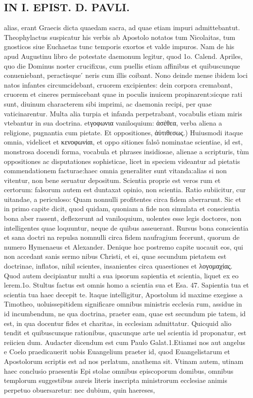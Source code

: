 \documentclass{article}
\begin{document}
\begin{pages}
\section*{IN I. EPIST. D. PAVLI. }
\marginpar{[ p.134 ]}\pstart alias, erant Graecis dicta quaedam sacra, ad quae etiam impuri admittebantut. Theophylactus suspicatur his verbis ab Apostolo notatos tum Nicolaitas, tum gnosticos siue Euchaetas tunc temporis exortos et valde impuros. Nam de his apud Augustinu libro de potestate daemonum legitur, quod 1o. Calend. Apriles, quo die Dominus noster crucifixus, cum puellis etiam affinibus et quibuscunque conueniebant, peractisque ́ neris cum illis coibant. Nono deinde mense ibidem loci natos infantes circumcidebant, cruorem excipientes: dein corpora cremabant, cruorem et cineres permiscebant quae in poculis inuicem propinarent:sicque rati sunt, diuinum characterem sibi imprimi, ac daemonia recipi, per quae vaticinarentur. Multa alia turpia et infanda perpetrabant, vocabulis etiam miris vtebantur in sua doctrina. etγοφωνια vaniloquium: ἀσέθεα, verba aliena a religione, pugnantia cum pietate.  \pend\pstart Et oppositiones, ἀὐτιθεσως.) Huiusmodi itaque omnia, videlicet et κενοφωνίαι, et oppo sitiones falsô nominatae scientiae, id est, monstrosa docendi forma, vocabula et phrases insidiosae, alienae a scripturis, tùm oppositiones ac disputationes sophisticae, licet in speciem videantur ad pietatis commendationem facturae:haec omnia generaliter sunt vitanda:alias si non vitentur, non bene seruatur depositum. Scientia proprie est veros rum et certorum: falsorum autem est duntaxat opinio, non scientia. Ratio subiicitur, cur uitandae, a periculoso: Quam nonnulli profitentes circa fidem aberrarunt. Sic et in primo capite dicit, quod quidam, quoniam a fide non simulata et conscientia bona aber rassent, deflexerunt ad vaniloquium, uolentes esse legis doctores, non intelligentes quae loquuntur, neque de quibus asseuerant. Rursus bona conscientia et sana doctri na repulsa nomnulli circa fidem naufragium fecerunt, quorum de numero Hymenaeus et Alexander. Denique hoc postremo capite uocauit eos, qui non accedant sanis sermo nibus Christi, et ei, quae secundum pietatem est doctrinae, inflatos, nihil scientes, insanientes circa quaestiones et λογομαχίας. Quod autem decipiantur multi a sua ipsorum sapientia et scientia, liquet ex eo lerem.1o. Stultus factus est omnis homo a scientia sua et Esa. 47. Sapientia tua et scientia tua haec decepit te. ltaque intelligitur, Apostolum id maxime exegisse a Timotheo, uoluissepitidem significare omnibus ministris ecclesia rum, assidue in id incumbendum, ne qua doctrina, praeter eam, quae est secundum pie tatem, id est, in qua docentur fides et charitas, in ecclesiam admittatur. Quicquid alio tendit et quibuscunque rationibus, quacunque arte uel scientia id proponatur, est reiicien dum. Audacter dicendum est cum Paulo Galat.1.Etiamsi nos aut angelus e Coelo praedicauerit uobis Euangelium praeter id, quod Euangelistarum et Apostolorum scriptis est ad nos perlatum, anathema sit. Vtinam autem, utinam haec conclusio praesentis Epi stolae omnibus episcoporum domibus, omnibus templorum suggestibus aureis literis inscripta ministrorum ecclesiae animis perpetuo obuersaretur: nec dubium, quin haereses, 
\end{pages}
\end{document}
